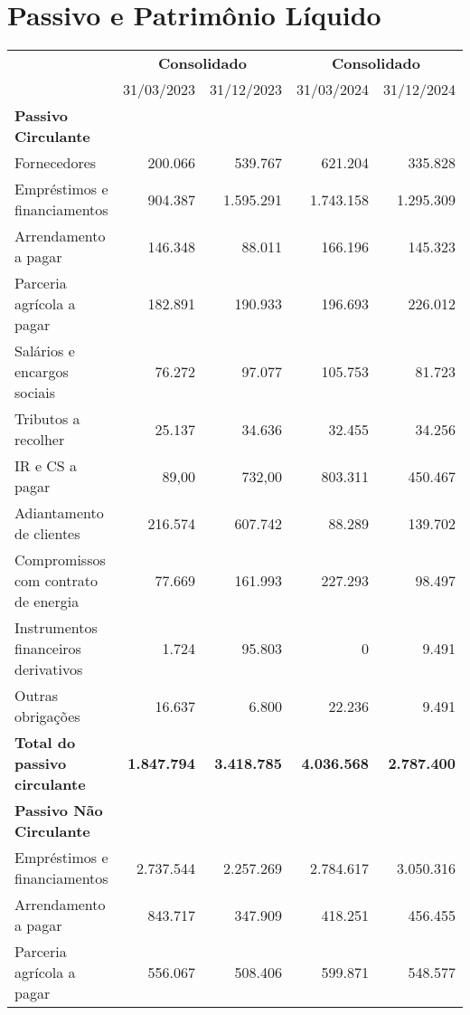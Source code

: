 \documentclass[1pt,a4paper]{article}
\begin{document}
		
		\newpage
		\centering\section*{Passivo e Patrimônio Líquido}
		\begin{longtable}{p{6cm} r r r r}
			\toprule
			& \multicolumn{2}{c}{\textbf{Consolidado}} & \multicolumn{2}{c}{\textbf{Consolidado}} \\
			\cmidrule(lr){2-3} \cmidrule(lr){4-5}
			& 31/03/2023 & 31/12/2023 & 31/03/2024 & 31/12/2024 \\
			\midrule
			\endhead
			\textbf{Passivo Circulante} & & & & \\
			Fornecedores & 200.066 & 539.767 & 621.204 & 335.828 \\
			Empréstimos e financiamentos & 904.387 & 1.595.291 & 1.743.158 & 1.295.309 \\
			Arrendamento a pagar & 146.348 & 88.011 & 166.196 & 145.323 \\
			Parceria agrícola a pagar & 182.891 & 190.933 & 196.693 & 226.012 \\
			Salários e encargos sociais & 76.272 & 97.077 & 105.753 & 81.723 \\
			Tributos a recolher & 25.137 & 34.636 & 32.455 & 34.256 \\
			IR e CS a pagar & 89,00 & 732,00 & 803.311 & 450.467 \\
			Adiantamento de clientes & 216.574 & 607.742 & 88.289 & 139.702 \\
			Compromissos com contrato de energia & 77.669 & 161.993 & 227.293 & 98.497 \\
			Instrumentos financeiros derivativos & 1.724 & 95.803 & 0 & 9.491 \\
			Outras obrigações & 16.637 & 6.800 & 22.236 & 9.491 \\
			\rowcolor{darkgray}\textbf{Total do passivo circulante} & \textbf{1.847.794} & \textbf{3.418.785} & \textbf{4.036.568} & \textbf{2.787.400} \\
			\midrule
			\textbf{Passivo Não Circulante} & & & & \\
			Empréstimos e financiamentos & 2.737.544 & 2.257.269 & 2.784.617 & 3.050.316 \\
			Arrendamento a pagar & 843.717 & 347.909 & 418.251 & 456.455 \\
			Parceria agrícola a pagar & 556.067 & 508.406 & 599.871 & 548.577 \\

\end{longtable}
\end{document}
